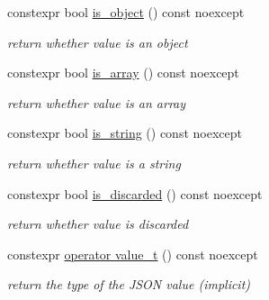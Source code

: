 \begin{DoxyCompactItemize}
constexpr bool \hyperlink{classnlohmann_1_1basic__json_af8f511af124e82e4579f444b4175787c}{is\+\_\+object} () const noexcept
\begin{DoxyCompactList}\small\item\em return whether value is an object \end{DoxyCompactList}\item 
constexpr bool \hyperlink{classnlohmann_1_1basic__json_aef9ce5dd2381caee1f8ddcdb5bdd9c65}{is\+\_\+array} () const noexcept
\begin{DoxyCompactList}\small\item\em return whether value is an array \end{DoxyCompactList}\item 
constexpr bool \hyperlink{classnlohmann_1_1basic__json_a69b596a4a6683b362095c9a139637396}{is\+\_\+string} () const noexcept
\begin{DoxyCompactList}\small\item\em return whether value is a string \end{DoxyCompactList}\item 
constexpr bool \hyperlink{classnlohmann_1_1basic__json_aabe623bc8304c2ba92d96d91f390fab4}{is\+\_\+discarded} () const noexcept
\begin{DoxyCompactList}\small\item\em return whether value is discarded \end{DoxyCompactList}\item 
constexpr \hyperlink{classnlohmann_1_1basic__json_a26ef3058e249f82a04f8ec18f7419027}{operator value\+\_\+t} () const noexcept
\begin{DoxyCompactList}\small\item\em return the type of the J\+S\+ON value (implicit) \end{DoxyCompactList}\end{DoxyCompactItemize}
